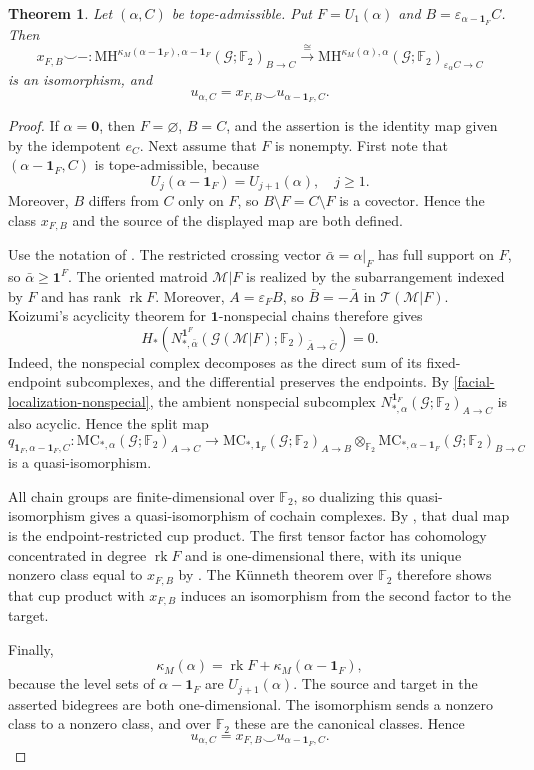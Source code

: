 \documentclass[10pt]{amsart}
\theoremstyle{plain}
\newtheorem{theorem}{Theorem}[section]
\theoremstyle{definition}
\newcommand{\zero}{\mathbf{0}}
\newcommand{\one}{\mathbf{1}}
\newcommand{\T}{\mathcal{T}}
\newcommand{\G}{\mathcal{G}}
\newcommand{\MC}{\mathrm{MC}}
\newcommand{\MH}{\mathrm{MH}}
\newcommand{\M}{\mathcal{M}}
\newcommand{\rk}{\operatorname{rk}}
\newcommand{\eps}{\varepsilon}
\newcommand{\Ftwo}{\mathbb F_2}
\begin{document}
\begin{theorem}\label{periodicity-product}
Let $(\alpha,C)$ be tope-admissible. Put $F=U_1(\alpha)$ and $B=\eps_{\alpha-\one_F}C$. Then
\[
x_{F,B}\smile-:\MH^{\kappa_M(\alpha-\one_F),\alpha-\one_F}(\G;\Ftwo)_{B\to C}\xrightarrow{\cong}\MH^{\kappa_M(\alpha),\alpha}(\G;\Ftwo)_{\eps_\alpha C\to C}
\]
is an isomorphism, and
\[
u_{\alpha,C}=x_{F,B}\smile u_{\alpha-\one_F,C}.
\]
\end{theorem}

\begin{proof}
If $\alpha=\zero$, then $F=\varnothing$, $B=C$, and the assertion is the identity map given by the idempotent $e_C$. Next assume that $F$ is nonempty. First note that $(\alpha-\one_F,C)$ is tope-admissible, because
\[
U_j(\alpha-\one_F)=U_{j+1}(\alpha),\quad j\geq1.
\]
Moreover, $B$ differs from $C$ only on $F$, so $B\setminus F=C\setminus F$ is a covector. Hence the class $x_{F,B}$ and the source of the displayed map are both defined.

Use the notation of . The restricted crossing vector $\bar\alpha=\alpha|_F$ has full support on $F$, so $\bar\alpha\geq\one^F$. The oriented matroid $\M|F$ is realized by the subarrangement indexed by $F$ and has rank $\rk F$. Moreover, $A=\eps_F B$, so $\bar B=-\bar A$ in $\T(\M|F)$. Koizumi's acyclicity theorem for $\one$-nonspecial chains \cite[Section 5]{Koizumi2026a} therefore gives
\[
H_*\left(N^{\one^F}_{*,\bar\alpha}(\G(\M|F);\Ftwo)_{\bar A\to\bar C}\right)=0.
\]
Indeed, the nonspecial complex decomposes as the direct sum of its fixed-endpoint subcomplexes, and the differential preserves the endpoints. By \eqref{facial-localization-nonspecial}, the ambient nonspecial subcomplex $N^{\one_F}_{*,\alpha}(\G;\Ftwo)_{A\to C}$ is also acyclic. Hence the split map
\[
q_{\one_F,\alpha-\one_F,C}:\MC_{*,\alpha}(\G;\Ftwo)_{A\to C}\to\MC_{*,\one_F}(\G;\Ftwo)_{A\to B}\otimes_{\Ftwo}\MC_{*,\alpha-\one_F}(\G;\Ftwo)_{B\to C}
\]
is a quasi-isomorphism.

All chain groups are finite-dimensional over $\Ftwo$, so dualizing this quasi-isomorphism gives a quasi-isomorphism of cochain complexes. By , that dual map is the endpoint-restricted cup product. The first tensor factor has cohomology concentrated in degree $\rk F$ and is one-dimensional there, with its unique nonzero class equal to $x_{F,B}$ by . The K\"unneth theorem over $\Ftwo$ therefore shows that cup product with $x_{F,B}$ induces an isomorphism from the second factor to the target.

Finally,
\[
\kappa_M(\alpha)=\rk F+\kappa_M(\alpha-\one_F),
\]
because the level sets of $\alpha-\one_F$ are $U_{j+1}(\alpha)$. The source and target in the asserted bidegrees are both one-dimensional. The isomorphism sends a nonzero class to a nonzero class, and over $\Ftwo$ these are the canonical classes. Hence
\[
u_{\alpha,C}=x_{F,B}\smile u_{\alpha-\one_F,C}.
\]
\end{proof}
\end{document}
